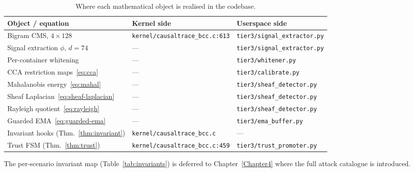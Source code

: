 \begin{table}[h]
\centering
\caption[Math-to-code mapping]{Where each mathematical object is realised
in the codebase.}
\label{tab:math-map}
\small
\begin{tabular}{lll}
\toprule
Object / equation & Kernel side & Userspace side \\
\midrule
Bigram CMS, $4 \times 128$                       & \texttt{kernel/causaltrace\_bcc.c:613} & \texttt{tier3/signal\_extractor.py} \\
Signal extraction $\phi$, $d{=}74$               & --- & \texttt{tier3/signal\_extractor.py} \\
Per-container whitening                          & --- & \texttt{tier3/whitener.py} \\
CCA restriction maps~\eqref{eq:cca}              & --- & \texttt{tier3/calibrate.py} \\
Mahalanobis energy~\eqref{eq:mahal}              & --- & \texttt{tier3/sheaf\_detector.py} \\
Sheaf Laplacian~\eqref{eq:sheaf-laplacian}       & --- & \texttt{tier3/sheaf\_detector.py} \\
Rayleigh quotient~\eqref{eq:rayleigh}            & --- & \texttt{tier3/sheaf\_detector.py} \\
Guarded EMA~\eqref{eq:guarded-ema}               & --- & \texttt{tier3/ema\_buffer.py} \\
Invariant hooks (Thm.~\ref{thm:invariant})       & \texttt{kernel/causaltrace\_bcc.c} & --- \\
Trust FSM (Thm.~\ref{thm:trust})                 & \texttt{kernel/causaltrace\_bcc.c:459} & \texttt{tier3/trust\_promoter.py} \\
\bottomrule
\end{tabular}
\end{table}

The per-scenario invariant map (Table~\ref{tab:invariants}) is deferred to
Chapter~\ref{Chapter4} where the full attack catalogue is introduced.
